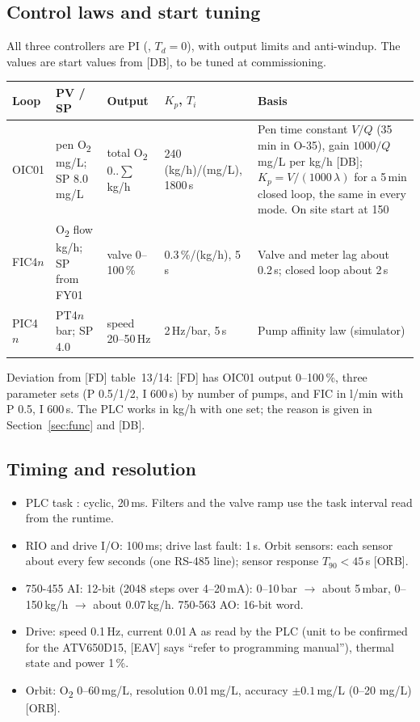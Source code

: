 \documentclass[11pt,a4paper]{article}
\newcommand{\Otwo}{O\textsubscript{2}}
\begin{document}
\subsection{Control laws and start tuning}
All three controllers are PI (, $T_d = 0$), with output limits and anti-windup.
The values are start values from  [DB], to be tuned at commissioning.
\begin{center}
\begin{small}
\begin{tabularx}{\textwidth}{@{}P{20mm}P{26mm}P{26mm}P{26mm}L@{}}
\toprule
Loop & PV / SP & Output & $K_p$, $T_i$ & Basis \\
\midrule
OIC01 & pen \Otwo{} mg/L; SP 8.0\,mg/L & total \Otwo{} 0..$\sum$ kg/h & 240 (kg/h)/(mg/L), 1800\,s & Pen time constant $V/Q$ (35\,min in O-35), gain $1000/Q$ mg/L per kg/h [DB]; $K_p = V/(1000\,\lambda)$ for a 5\,min closed loop, the same in every mode. On site start at 150 \\
FIC4$n$ & \Otwo{} flow kg/h; SP from FY01 & valve 0--100\,\% & 0.3\,\%/(kg/h), 5\,s & Valve and meter lag about 0.2\,s; closed loop about 2\,s \\
PIC4$n$ & PT4$n$ bar; SP 4.0 & speed 20--50\,Hz & 2\,Hz/bar, 5\,s & Pump affinity law (simulator) \\
\bottomrule
\end{tabularx}
\end{small}
\end{center}
Deviation from [FD] table~13/14: [FD] has OIC01 output 0--100\,\%, three parameter sets (P 0.5/1/2,
I 600\,s) by number of pumps, and FIC in l/min with P 0.5, I 600\,s. The PLC works in kg/h with one
set; the reason is given in Section~\ref{sec:func} and [DB].

\subsection{Timing and resolution}
\begin{itemize}[nosep]
  \item PLC task : cyclic, 20\,ms. Filters and the valve ramp use the task interval read
        from the runtime.
  \item RIO and drive I/O: 100\,ms; drive last fault: 1\,s. Orbit sensors: each sensor about every
        few seconds (one RS-485 line); sensor response $T_{90} < 45$\,s [ORB].
  \item 750-455 AI: 12-bit (2048 steps over 4--20\,mA): 0--10\,bar $\rightarrow$ about 5\,mbar,
        0--150\,kg/h $\rightarrow$ about 0.07\,kg/h. 750-563 AO: 16-bit word.
  \item Drive: speed 0.1\,Hz, current 0.01\,A as read by the PLC (unit to be confirmed for the
        ATV650D15, [EAV] says ``refer to programming manual''), thermal state and power 1\,\%.
  \item Orbit: \Otwo{} 0--60\,mg/L, resolution 0.01\,mg/L, accuracy $\pm0.1$\,mg/L (0--20 mg/L) [ORB].
\end{itemize}
\end{document}
